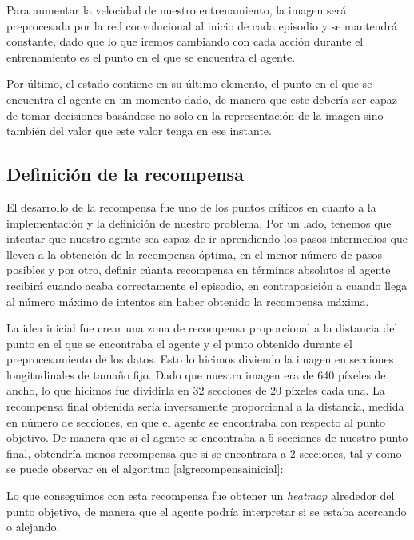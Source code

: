 Para aumentar la velocidad de nuestro entrenamiento, la imagen será preprocesada por la red convolucional al inicio de cada episodio y se mantendrá constante, dado que lo que iremos cambiando con cada acción durante el entrenamiento es el punto en el que se encuentra el agente.
\medskip

Por último, el estado contiene en su último elemento, el punto en el que se encuentra el agente en un momento dado, de manera que este debería ser capaz de tomar decisiones basándose no solo en la representación de la imagen sino también del valor que este valor tenga en ese instante.

\subsection{Definición de la recompensa}
\label{definicion-de-recompensa}

El desarrollo de la recompensa fue uno de los puntos críticos en cuanto a la implementación y la definición de nuestro problema. Por un lado, tenemos que intentar que nuestro agente sea capaz de ir aprendiendo los pasos intermedios que lleven a la obtención de la recompensa óptima, en el menor número de pasos posibles y por otro, definir cúanta recompensa en términos absolutos el agente recibirá cuando acaba correctamente el episodio, en contraposición a cuando llega al número máximo de intentos sin haber obtenido la recompensa máxima.
\medskip

La idea inicial fue crear una zona de recompensa proporcional a la distancia del punto en el que se encontraba el agente y el punto obtenido durante el preprocesamiento de los datos. Esto lo hicimos diviendo la imagen en secciones longitudinales de tamaño fijo. Dado que nuestra imagen era de 640 píxeles de ancho, lo que hicimos fue dividirla en 32 secciones de 20 píxeles cada una. La recompensa final obtenida sería inversamente proporcional a la distancia, medida en número de secciones, en que el agente se encontraba con respecto al punto objetivo. De manera que si el agente se encontraba a 5 secciones de nuestro punto final, obtendría menos recompensa que si se encontrara a 2 secciones, tal y como se puede observar en el algoritmo \ref{algrecompensainicial}:
\medskip
\vspace{3ex}

\vspace{3ex}

Lo que conseguimos con esta recompensa fue obtener un \textit{heatmap} alrededor del punto objetivo, de manera que el agente podría interpretar si se estaba acercando o alejando. 
\medskip

